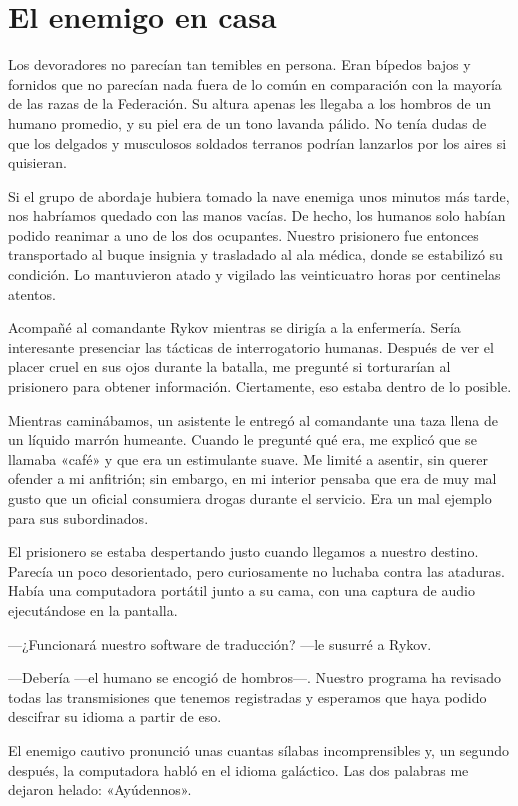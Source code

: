 \chapter{El enemigo en casa}\label{sec:el-enemigo-en-casa}

Los devoradores no parecían tan temibles en persona. Eran bípedos bajos y fornidos que no parecían nada fuera de lo común en comparación con la mayoría de las razas de la Federación. Su altura apenas les llegaba a los hombros de un humano promedio, y su piel era de un tono lavanda pálido. No tenía dudas de que los delgados y musculosos soldados terranos podrían lanzarlos por los aires si quisieran.

Si el grupo de abordaje hubiera tomado la nave enemiga unos minutos más tarde, nos habríamos quedado con las manos vacías. De hecho, los humanos solo habían podido reanimar a uno de los dos ocupantes. Nuestro prisionero fue entonces transportado al buque insignia y trasladado al ala médica, donde se estabilizó su condición. Lo mantuvieron atado y vigilado las veinticuatro horas por centinelas atentos.

Acompañé al comandante Rykov mientras se dirigía a la enfermería. Sería interesante presenciar las tácticas de interrogatorio humanas. Después de ver el placer cruel en sus ojos durante la batalla, me pregunté si torturarían al prisionero para obtener información. Ciertamente, eso estaba dentro de lo posible.

Mientras caminábamos, un asistente le entregó al comandante una taza llena de un líquido marrón humeante. Cuando le pregunté qué era, me explicó que se llamaba «café» y que era un estimulante suave. Me limité a asentir, sin querer ofender a mi anfitrión; sin embargo, en mi interior pensaba que era de muy mal gusto que un oficial consumiera drogas durante el servicio. Era un mal ejemplo para sus subordinados.

El prisionero se estaba despertando justo cuando llegamos a nuestro destino. Parecía un poco desorientado, pero curiosamente no luchaba contra las ataduras. Había una computadora portátil junto a su cama, con una captura de audio ejecutándose en la pantalla.

—¿Funcionará nuestro software de traducción? —le susurré a Rykov.

—Debería —el humano se encogió de hombros—. Nuestro programa ha revisado todas las transmisiones que tenemos registradas y esperamos que haya podido descifrar su idioma a partir de eso.

El enemigo cautivo pronunció unas cuantas sílabas incomprensibles y, un segundo después, la computadora habló en el idioma galáctico. Las dos palabras me dejaron helado: «Ayúdennos».

